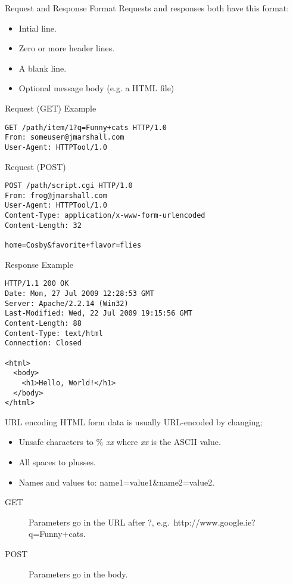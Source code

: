 \begin{frame}[fragile]{Request and Response Format}
  Requests and responses both have this format:
  \begin{itemize}
    \item Intial line.
    \item Zero or more header lines.
    \item A blank line.
    \item Optional message body (e.g. a HTML file)
  \end{itemize}
\end{frame}


\begin{frame}[fragile]{Request (GET) Example}
  \begin{verbatim}
GET /path/item/1?q=Funny+cats HTTP/1.0
From: someuser@jmarshall.com
User-Agent: HTTPTool/1.0
  \end{verbatim}
\end{frame}

\begin{frame}[fragile]{Request (POST)}
  \begin{verbatim}
POST /path/script.cgi HTTP/1.0
From: frog@jmarshall.com
User-Agent: HTTPTool/1.0
Content-Type: application/x-www-form-urlencoded
Content-Length: 32

home=Cosby&favorite+flavor=flies
  \end{verbatim}
\end{frame}

\begin{frame}[fragile]{Response Example}
  \begin{verbatim}
HTTP/1.1 200 OK
Date: Mon, 27 Jul 2009 12:28:53 GMT
Server: Apache/2.2.14 (Win32)
Last-Modified: Wed, 22 Jul 2009 19:15:56 GMT
Content-Length: 88
Content-Type: text/html
Connection: Closed

<html>
  <body>
    <h1>Hello, World!</h1>
  </body>
</html>
  \end{verbatim}
\end{frame}


\begin{frame}{URL encoding}
  HTML form data is usually URL-encoded by changing;
  \begin{itemize}
    \item Unsafe characters to \% \emph{xx} where \emph{xx} is the ASCII value.
    \item All spaces to plusses.
    \item Names and values to: name1=value1\&name2=value2.
  \end{itemize}
  
  \begin{description}
    \item[GET] Parameters go in the URL after ?, e.g.\ http://www.google.ie?q=Funny+cats.
    \item[POST] Parameters go in the body.
  \end{description}
\end{frame}

